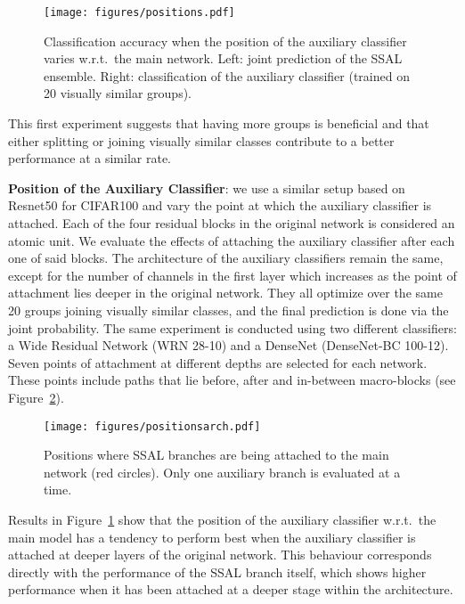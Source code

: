 \documentclass[10pt,twocolumn,letterpaper]{article}
\begin{document}
\begin{figure}
\centering
    \texttt{[image: figures/positions.pdf]}
	\caption{Classification accuracy when the position of the auxiliary classifier varies w.r.t.~the main network. Left: joint prediction of the SSAL ensemble. Right: classification of the auxiliary classifier (trained on 20 visually similar groups).}
	\label{fig:cifar100postion}
\end{figure}

This first experiment suggests that having more groups is beneficial and that either splitting or joining visually similar classes contribute to a better performance at a similar rate.

\textbf{Position of the Auxiliary Classifier}: we use a similar setup based on Resnet50 for CIFAR100 and vary the point at which the auxiliary classifier is attached.
Each of the four residual blocks in the original network is considered an atomic unit.
We evaluate the effects of attaching the auxiliary classifier after each one of said blocks.
The architecture of the auxiliary classifiers remain the same, except for the number of channels in the first layer which increases as the point of attachment lies deeper in the original network.
They all optimize over the same 20 groups joining visually similar classes, and the final prediction is done via the joint probability.
The same experiment is conducted using two different classifiers: a Wide Residual Network (WRN 28-10) and a DenseNet (DenseNet-BC 100-12).
Seven points of attachment at different depths are selected for each network.
These points include paths that lie before, after and in-between macro-blocks (see Figure~\ref{fig:attachmentpoints}).

\begin{figure}[t]
\centering
    \texttt{[image: figures/positionsarch.pdf]}
	\caption{Positions where SSAL branches are being attached to the main network (red circles). Only one auxiliary branch is evaluated at a time.}
	\label{fig:attachmentpoints}
\end{figure}


Results in Figure~\ref{fig:cifar100postion} show that the position of the auxiliary classifier w.r.t.~the main model has a tendency to perform best when the auxiliary classifier is attached at deeper layers of the original network.
This behaviour corresponds directly with the performance of the SSAL branch itself, which shows higher performance when it has been attached at a deeper stage within the architecture.
\end{document}
